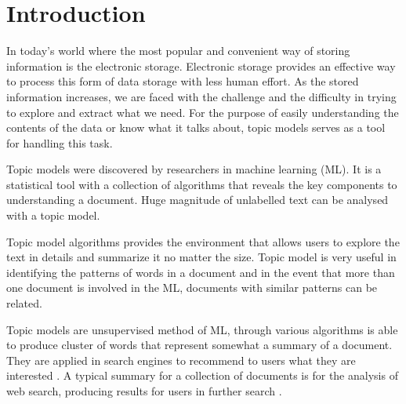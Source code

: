 \chapter{Introduction}

%
%
%

In today's world where the most popular and convenient way of storing information is the electronic storage. Electronic storage provides an effective way to process this form of data storage with less human effort. As the stored information increases, we are faced with the challenge and the difficulty in trying to explore and extract what we need. For the purpose of easily understanding the contents of the data or know what it talks about, topic models serves as a tool for handling this task.

Topic models were discovered by researchers in  machine learning (ML).  It is a statistical tool with a collection of algorithms that reveals the key components to understanding a document. Huge magnitude of unlabelled text can be analysed with a topic model.

Topic model algorithms provides the environment that allows   users to explore the text in details and summarize it no matter the size. Topic model is very useful in identifying the patterns of words in a document and in the event that more than one document is involved in the ML, documents with similar patterns can be related. 

Topic models are unsupervised method of ML, through various algorithms is able to produce cluster of words that represent somewhat a summary of a document. They are applied in search engines to recommend to users what they are interested . A typical summary for a collection of documents is for the analysis of web search, producing results for users in further search \citep{turpin2007fast} . %

